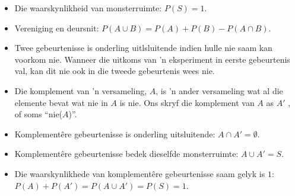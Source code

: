\begin{itemize}
\item Die waarskynlikheid van monsterruimte:  $P(S)=1$.

\item Vereniging en deursnit: $P(A \cup B) = P(A) + P(B) - P(A \cap B)$.


\item Twee gebeurtenisse is onderling uitlsluitende indien hulle nie saam kan voorkom
nie. Wanneer die uitkoms van ’n eksperiment in eerste gebeurtenis val, kan dit nie
ook in die tweede gebeurtenis wees nie.



\item Die komplement van ’n versameling, $A$, is ’n ander versameling wat al die elemente
bevat wat nie in $A$ is nie. Ons skryf die komplement van $A$ as $A'$ , of soms “nie($A$)”.


\item Komplementêre gebeurtenisse is onderling uitsluitende: $A \cap A' = \emptyset$.


\item Komplementêre gebeurtenisse bedek dieselfde monsterruimte:
$A \cup A' = S$.


\item Die waarskynlikhede van komplementêre gebeurtenisse
saam gelyk is
 $1$: $P(A) + P(A') = P(A \cup A') = P(S) = 1$.

\end{itemize}
